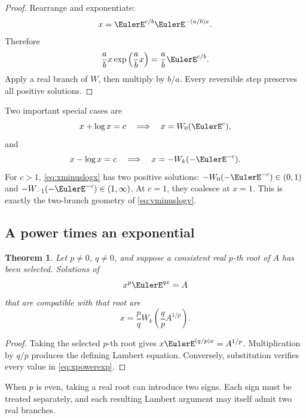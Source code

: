 \documentclass[11pt]{article}
\newtheorem{theorem}{Theorem}[section]
\theoremstyle{remark}
\begin{document}
\begin{proof}
Rearrange and exponentiate:
\[
       x=\EulerE^{c/b}\EulerE^{-(a/b)x}.
\]
Therefore
\[
       \frac abx\exp\left(\frac abx\right)
       =\frac ab\EulerE^{c/b}.
\]
Apply a real branch of \(W\), then multiply by \(b/a\).
Every reversible step preserves all positive solutions.
\end{proof}

Two important special cases are
\[
       x+\log x=c
       \quad\Longrightarrow\quad
       x=W_0(\EulerE^c),
\]
and
\begin{equation}\label{eq:xminuslogx}
       x-\log x=c
       \quad\Longrightarrow\quad
       x=-W_k(-\EulerE^{-c}).
\end{equation}
For \(c>1\), \eqref{eq:xminuslogx} has two positive solutions:
\(-W_0(-\EulerE^{-c})\in(0,1)\) and
\(-W_{-1}(-\EulerE^{-c})\in(1,\infty)\).  At \(c=1\), they coalesce at
\(x=1\).  This is exactly the two-branch geometry of
\cref{eq:vminuslogv}.

\subsection{A power times an exponential}

\begin{theorem}\label{thm:xpowerexp}
Let \(p\neq0\), \(q\neq0\), and suppose a consistent real \(p\)-th root of
\(A\) has been selected.  Solutions of
\[
       x^p\EulerE^{qx}=A
\]
that are compatible with that root are
\begin{equation}\label{eq:xpowerexp}
       x=\frac pq
       W_k\left(\frac qp A^{1/p}\right).
\end{equation}
\end{theorem}

\begin{proof}
Taking the selected \(p\)-th root gives
\(x\EulerE^{(q/p)x}=A^{1/p}\).  Multiplication by \(q/p\) produces the defining
Lambert equation.  Conversely, substitution verifies every value in
\eqref{eq:xpowerexp}.
\end{proof}

When \(p\) is even, taking a real root can introduce two signs.  Each sign
must be treated separately, and each resulting Lambert argument may itself
admit two real branches.
\end{document}
